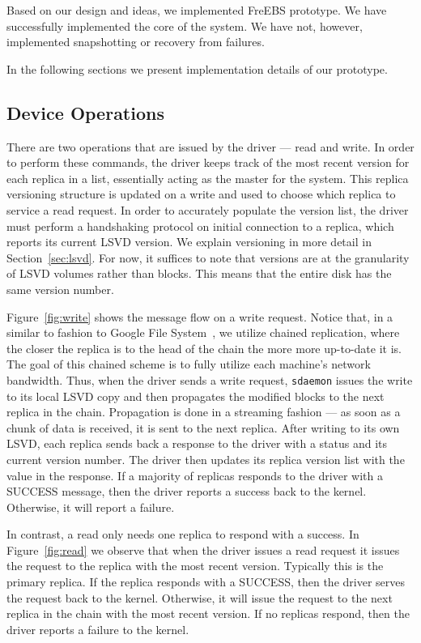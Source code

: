 Based on our design and ideas, we implemented FreEBS prototype. We have successfully implemented the core of the system. We have not, however, implemented snapshotting or recovery from failures.

In the following sections we present implementation details of our prototype.

\subsection{Device Operations}
\label{sec:readwrite}
There are two operations that are issued by the driver --- read and write.
In order to perform these commands, the driver keeps track of the most 
recent version for each replica in a list, essentially acting as the master
for the system. This replica versioning structure is updated on a write and 
used to choose which replica to service a read request. In order to 
accurately populate the version list, the driver must perform a handshaking 
protocol on initial connection to a replica, which reports its current LSVD
version. We explain versioning in more detail in Section~\ref{sec:lsvd}. For 
now, it suffices to note that versions are at the granularity of LSVD
volumes rather than blocks. This means that the entire disk has the same 
version number. 

Figure~\ref{fig:write} shows the message flow on a write request. Notice
that, in a similar to fashion to Google File System~\cite{ghemawat2003google}, 
we utilize chained replication, where the closer the replica is to the 
head of the chain the more more up-to-date it is. The goal of this chained
scheme is to fully utilize each machine's network bandwidth. Thus, when 
the driver sends a write request, \texttt{sdaemon} issues the write to its 
local LSVD copy and then propagates the modified blocks to the next replica 
in the chain. Propagation is done in a streaming fashion --- as soon as a 
chunk of data is received, it is sent to the next replica. After writing to 
its own LSVD, each replica sends back a 
response to the driver with a status and its current version number. The 
driver then updates its replica version list with the value in the response. 
If a majority of replicas responds to the driver with a SUCCESS message, 
then the driver reports a success back to the kernel. Otherwise, it will 
report a failure. 

In contrast, a read only needs one replica to respond with a success. In 
Figure~\ref{fig:read} we observe that when the driver issues a read request 
it issues the request to the replica with the most recent version. Typically 
this is the primary replica. If the replica responds with a SUCCESS, then 
the driver serves the request back to the kernel. Otherwise, it will issue 
the request to the next replica in the chain with the most recent version. 
If no replicas respond, then the driver reports a failure to the kernel.

